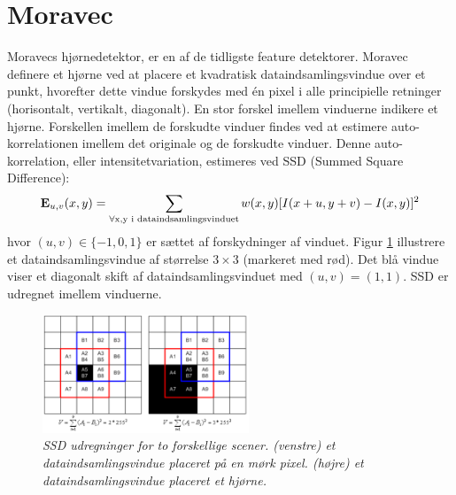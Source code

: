 \section{Moravec}\label{sec:moravec}
Moravecs hjørnedetektor\cite{moravec}, er en af de tidligste feature detektorer. Moravec definere et hjørne ved at placere et kvadratisk dataindsamlingsvindue over et punkt, hvorefter dette vindue forskydes med én pixel i alle principielle retninger (horisontalt, vertikalt, diagonalt). En stor forskel imellem vinduerne indikere et hjørne. Forskellen imellem de forskudte vinduer findes ved at estimere auto-korrelationen imellem det originale og de forskudte vinduer. Denne auto-korrelation, eller intensitetvariation, estimeres ved SSD (Summed Square Difference):
\begin{equation}
\bold{E}_{u,v}(x,y)= \sum_{\forall \text{x,y i dataindsamlingsvinduet}} w(x,y)[I(x+u,y+v) - I(x,y)]^2
\label{moravec}     
\end{equation}
hvor $(u,v)\in \lbrace -1,0,1 \rbrace$ er sættet af forskydninger af vinduet.
Figur \ref{fig:moravec} illustrere et dataindsamlingsvindue af størrelse $3\times3$ (markeret med rød). Det blå vindue viser et diagonalt skift af dataindsamlingsvinduet med $(u,v)=(1,1)$. SSD er udregnet imellem vinduerne.
\begin{figure}[H]
    \centering
    \includegraphics[width=0.55\textwidth]{fig/25.png}
     \vspace{-1em}
    \begin{center}    
       \caption{{\footnotesize \textit{SSD udregninger for to forskellige scener. (venstre) et dataindsamlingsvindue placeret på en mørk pixel. (højre) et dataindsamlingsvindue placeret et hjørne. }}}
    \label{fig:moravec}
     \end{center}
     \vspace{-2.5em}
  \end{figure} \noindent   
